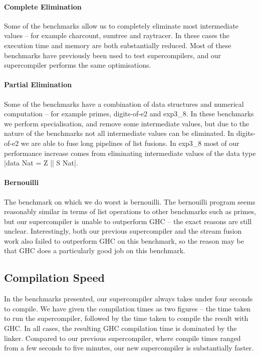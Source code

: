 \documentclass[draft]{sigplanconf}
\begin{document}
\paragraph{Complete Elimination} Some of the benchmarks allow us to completely eliminate most intermediate values -- for example charcount, sumtree and raytracer. In these cases the execution time and memory are both substantially reduced. Most of these benchmarks have previously been used to test supercompilers, and our supercompiler performs the same optimisations.

\paragraph{Partial Elimination} Some of the benchmarks have a combination of data structures and numerical computation -- for example primes, digits-of-e2 and exp3\_8. In these benchmarks we perform specialisation, and remove some intermediate values, but due to the nature of the benchmarks not all intermediate values can be eliminated. In digits-of-e2 we are able to fuse long pipelines of list fusions. In exp3\_8 most of our performance increase comes from eliminating intermediate values of the data type |data Nat = Z || S Nat|.

\paragraph{Bernouilli} The benchmark on which we do worst is bernouilli. The bernouilli program seems reasonably similar in terms of list operations to other benchmarks such as primes, but our supercompiler is unable to outperform GHC -- the exact reasons are still unclear. Interestingly, both our previous supercompiler and the stream fusion work also failed to outperform GHC on this benchmark, so the reason may be that GHC does a particularly good job on this benchmark.

\subsection{Compilation Speed}
\label{sec:benchmarks_compile}

In the benchmarks presented, our supercompiler always takes under four seconds to compile. We have given the compilation times as two figures -- the time taken to run the supercompiler, followed by the time taken to compile the result with GHC. In all cases, the resulting GHC compilation time is dominated by the linker. Compared to our previous supercompiler, where compile times ranged from a few seconds to five minutes, our new supercompiler is substantially faster.
\end{document}
